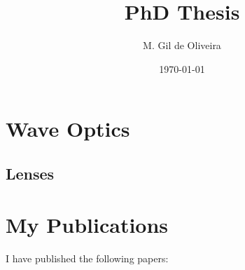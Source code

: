\documentclass[a4paper,10pt]{report}
\title{PhD Thesis}
\author{M. Gil de Oliveira}
\date{\today}
\begin{document}
\maketitle

\chapter{Wave Optics}

\section{Lenses}

\chapter{My Publications}

I have published the following papers: \cite{PhysRevA.108.013503, DEOLIVEIRA2024110983, 48bj-bm8b}



\end{document}
